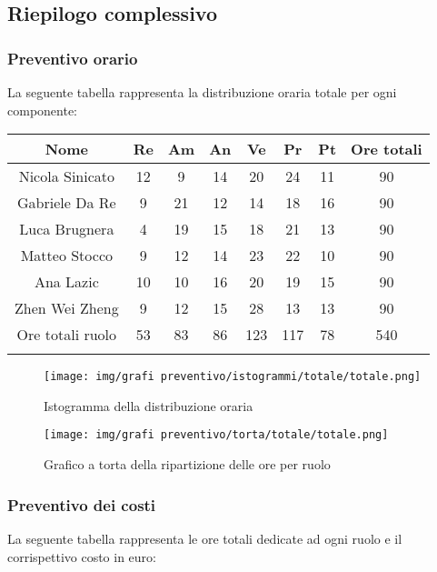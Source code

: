 %

\newpage
\subsection{Riepilogo complessivo}
%
\subsubsection{Preventivo orario}
La seguente tabella rappresenta la distribuzione oraria totale per ogni componente:

	\setlength\extrarowheight{5pt}
	\begin{tabularx}{\textwidth}{|ccccccc|c|}
		\hline
		\rowcolor{white}
		\textbf{Nome} & \textbf{Re} & \textbf{Am} & \textbf{An} & \textbf{Ve} & \textbf{Pr}& \textbf{Pt} & \textbf{Ore totali} \\
		\hline
		Nicola Sinicato &12&9&14&20&24&11&90 \\
		Gabriele Da Re &9&21&12&14&18&16&90 \\
		Luca Brugnera &4&19&15&18&21&13&90 \\
		Matteo Stocco &9&12&14&23&22&10&90 \\
		Ana Lazic &10&10&16&20&19&15&90 \\
		Zhen Wei Zheng &9&12&15&28&13&13&90 \\
		\hline
		Ore totali ruolo &53&83&86&123&117&78&540 \\
		\hline
		\rowcolor{white}
		\caption{Ripartizione globale delle ore per ruolo e persona}
	\end{tabularx}
	\vspace{10pt}
	
\begin{figure}[H]
    \centering
    \texttt{[image: img/grafi preventivo/istogrammi/totale/totale.png]}
    \caption{Istogramma della distribuzione oraria}
\end{figure}
\begin{figure}[H]
    \centering
    \texttt{[image: img/grafi preventivo/torta/totale/totale.png]}
    \caption{Grafico a torta della ripartizione delle ore per ruolo}
\end{figure}
\subsubsection{Preventivo dei costi}
La seguente tabella rappresenta le ore totali dedicate ad ogni ruolo e il corrispettivo costo in euro:

